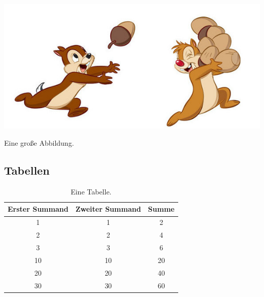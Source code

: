 \begin{table}
	\centering
	\includegraphics{Abbildungen/ChipAndDale_large.png}
	\caption{Eine große Abbildung.}
	\label{figure:Logo3}
\end{table}

\clearpage
\subsection{Tabellen}

\begin{table}[h]
	\centering
	\begin{tabular}{ccc}
		\toprule
		\textbf{Erster Summand}	& \textbf{Zweiter Summand} & \textbf{Summe} \\
		\midrule
		1 & 1 & 2 \\
		2 & 2 & 4 \\
		3 & 3 & 6 \\
		\midrule
		10 & 10 & 20 \\
		20 & 20 & 40 \\
		30 & 30 & 60 \\
		\bottomrule
	\end{tabular}
	\caption{Eine Tabelle.}
	\label{table:Summe}
\end{table}

